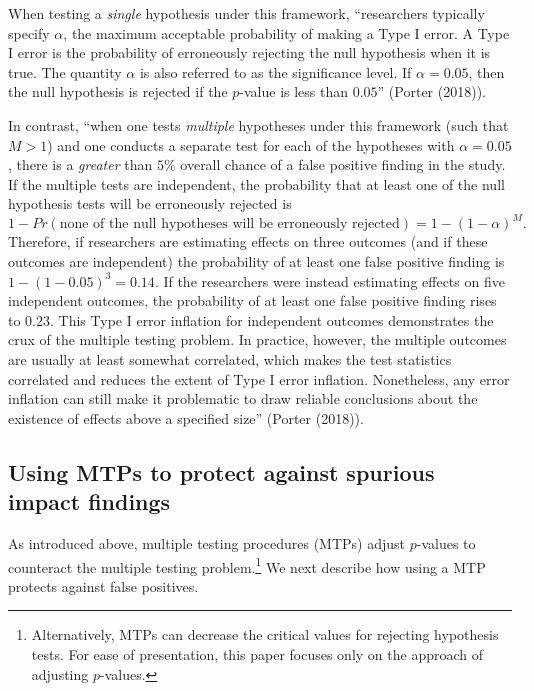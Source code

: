 \documentclass[
]{article}
\begin{document}
When testing a \emph{single} hypothesis under this framework,
``researchers typically specify \(\alpha\), the maximum acceptable
probability of making a Type I error. A Type I error is the probability
of erroneously rejecting the null hypothesis when it is true. The
quantity \(\alpha\) is also referred to as the significance level. If
\(\alpha=0.05\), then the null hypothesis is rejected if the \(p\)-value
is less than \(0.05\)'' (Porter (2018)).

In contrast, ``when one tests \emph{multiple} hypotheses under this
framework (such that \(M>1\)) and one conducts a separate test for each
of the hypotheses with \(\alpha=0.05\), there is a \emph{greater} than
\(5\%\) overall chance of a false positive finding in the study. If the
multiple tests are independent, the probability that at least one of the
null hypothesis tests will be erroneously rejected is
\[1-Pr(\text{none of the null hypotheses will be erroneously rejected}) = 1-(1-\alpha)^M.\]
Therefore, if researchers are estimating effects on three outcomes (and
if these outcomes are independent) the probability of at least one false
positive finding is \(1-(1-0.05)^3=0.14\). If the researchers were
instead estimating effects on five independent outcomes, the probability
of at least one false positive finding rises to \(0.23\). This Type I
error inflation for independent outcomes demonstrates the crux of the
multiple testing problem. In practice, however, the multiple outcomes
are usually at least somewhat correlated, which makes the test
statistics correlated and reduces the extent of Type I error inflation.
Nonetheless, any error inflation can still make it problematic to draw
reliable conclusions about the existence of effects above a specified
size'' (Porter (2018)).

\subsection{Using MTPs to protect against spurious impact findings}
\label{sec:mtp_use}

As introduced above, multiple testing procedures (MTPs) adjust
\(p\)-values to counteract the multiple testing
problem.\footnote{Alternatively, MTPs can decrease the critical values for rejecting hypothesis tests. For ease of presentation, this paper focuses only on the approach of adjusting $p$-values.}
We next describe how using a MTP protects against false positives.
\end{document}
